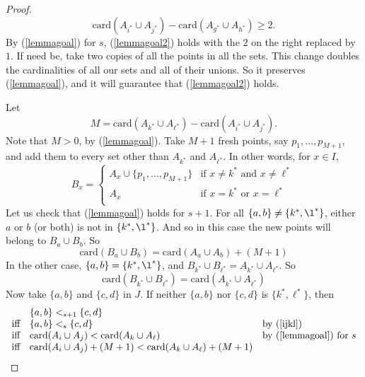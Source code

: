 \documentclass[12pt]{article}
\theoremstyle{definition}
\newcommand{\set}[1]{\{ #1 \}}
\newcommand{\card}{\mbox{card}}
\begin{document}
\begin{proof}
\begin{equation}\label{lemmagoal2}
    \card({A}_{i^*} \cup {A}_{j^*}) - \card({A}_{g^*} \cup {A}_{h^*})   \geq 2. 
\end{equation}
By (\ref{lemmagoal}) for $s$,   (\ref{lemmagoal2}) holds with the $2$ on the right replaced by $1$.
If need be, take two copies of all the points in all the sets.  This
change doubles the cardinalities of all our sets and all of their unions.
So it preserves  (\ref{lemmagoal}), and it
 will guarantee that (\ref{lemmagoal2}) holds.
 
 
Let \begin{equation}\label{Meq}
 M = \card({A}_{k^*} \cup {A}_{\ell^*}) - \card({A}_{i^*} \cup {A}_{j^*}).\end{equation}
Note that $M > 0$, by (\ref{lemmagoal}).
Take $M+ 1$ fresh points, say $p_1, \ldots, p_{M+1}$, and add them to every set other than 
${A}_{k^*}$ and ${A}_{\ell^*}$.   
In other words, for $x\in I$,
\[
B_{x} = \left\{
\begin{array}{ll}
{A}_x \cup \set{p_1, \ldots, p_{M+1}}  & \mbox{if $x \neq k^*$ and $x \neq \ell^*$} \\
{A}_x   & \mbox{if $x = k^*$ or $x = \ell^*$} \\
\end{array}
\right.
\]
Let us check that (\ref{lemmagoal}) holds for $s+1$.
For all $\set{a,b} \neq \set{k^*, \l^*}$,  either $a$ or $b$ (or both) is not in $\set{k^*, \l^*}$.  And so in this case
the new points will belong to $B_{a} \cup B_b$.  So
\begin{equation}\label{andso}
 \card(B_a \cup  B_b)   = \card({A}_a \cup  {A}_b) + (M + 1) \end{equation}
In the other case,  $\set{a,b} = \set{k^*, \l^*}$,   and $B_{k^*} \cup  B_{\ell^*}  = {A}_{k^*}  \cup  {A}_{\ell^*} $.  So
 \begin{equation}\label{defh}
 \card(B_{k^*} \cup  B_{\ell^*} )   = \card({A}_{k^*}  \cup  {A}_{\ell^*} )  \end{equation}
Now take $\set{a,b}$ and $\set{c,d}$ in $J$.
If neither $\set{a,b}$ nor $\set{c,d}$ is $\set{k^*,\ell^*}$, then 
\[
\begin{array}{cll}
 & \set{a,b} <_{s+1} \set{c,d} \\
 \mbox{iff} &  \set{a,b} <_{s} \set{c,d} & \mbox{by (\ref{ijkl})}\\
  \mbox{iff} & \card({A}_i \cup {A}_j ) < \card({A}_k \cup {A}_{\ell}) &\mbox{by  (\ref{lemmagoal}) for $s$} \\
  \mbox{iff} & \card({A}_i \cup {A}_j ) + (M+1)  < \card({A}_k \cup {A}_{\ell})  + (M+1) \\ 

\end{array}\]
\end{proof}
\end{document}
